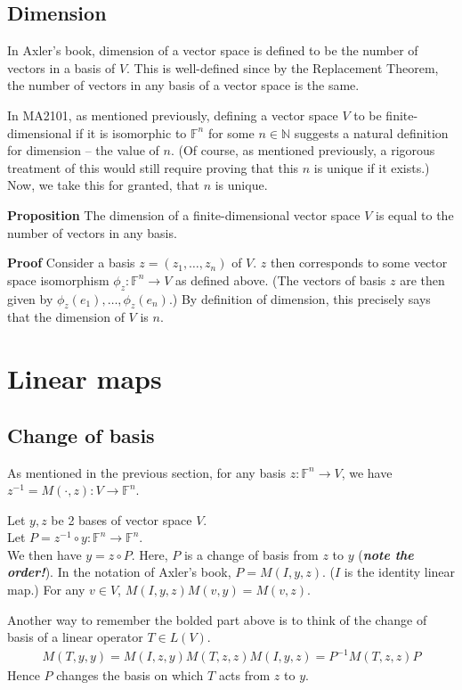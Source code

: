 \documentclass{article}
\begin{document}
\subsection{Dimension}
In Axler's book, dimension of a vector space is defined to be the number of vectors in a basis of $V$. This is well-defined since by the Replacement Theorem, the number of vectors in any basis of a vector space is the same.

In MA2101, as mentioned previously, defining a vector space $V$ to be  finite-dimensional if it is isomorphic to $\mathbb{F}^n$ for some $n\in \mathbb{N}$ suggests a natural definition for dimension -- the value of $n$. (Of course, as mentioned previously, a rigorous treatment of this would still require proving that this $n$ is unique if it exists.) Now, we take this for granted, that $n$ is unique.

\textbf{Proposition} The dimension of a finite-dimensional vector space $V$ is equal to the number of vectors in any basis.

\textbf{Proof} Consider a basis $z=(z_1,\dots,z_n)$ of $V$. $z$ then corresponds to some vector space isomorphism $\phi_z:\mathbb{F}^n\rightarrow V$ as defined above. (The vectors of basis $z$ are then given by $\phi_z(e_1),\dots,\phi_z(e_n)$.) By definition of dimension, this precisely says that the dimension of $V$ is $n$.

\section{Linear maps}

\subsection{Change of basis}
As mentioned in the previous section, for any basis $z:\mathbb{F}^n\rightarrow V$, we have $z^{-1}=M(\cdot,z):V\rightarrow \mathbb{F}^n$.

Let $y,z$ be 2 bases of vector space $V$.\\
Let $P=z^{-1}\circ y:\mathbb{F}^n\rightarrow \mathbb{F}^n$.\\
We then have $y=z\circ P$. Here, $P$ is a change of basis from $z$ to $y$ (\textbf{\textit{note the order!}}). In the notation of Axler's book, $P=M(I, y, z)$. ($I$ is the identity linear map.) For any $v\in V$, $M(I,y,z)M(v,y)=M(v,z)$.

Another way to remember the bolded part above is to think of the change of basis of a linear operator $T\in L(V)$.
\begin{align*}
	M(T, y, y) = M(I, z, y)M(T, z, z)M(I, y, z) = P^{-1}M(T, z, z)P
\end{align*}
Hence $P$ changes the basis on which $T$ acts from $z$ to $y$.
\end{document}
